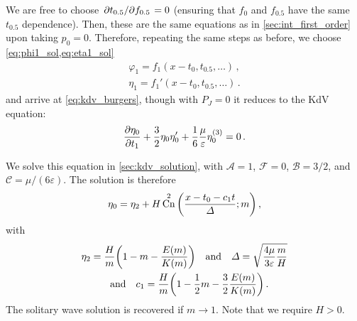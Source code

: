 \documentclass{jfm}
\DeclareMathOperator{\cn}{Cn}
\renewcommand*{\epsilon}{\varepsilon}
\begin{document}
We are free to choose $\pdv*{t_{0.5}}{f_{0.5}} = 0$ (ensuring that $f_0$
and $f_{0.5}$ have the same $t_{0.5}$ dependence).
Then, these are the same equations as in \cref{sec:int_first_order} upon
taking $p_0=0$.
Therefore, repeating the same steps as before, we choose
\cref{eq:phi1_sol,eq:eta1_sol}
\begin{align}
  \varphi_1 = f_1(x-t_0,t_{0.5},\ldots) \,, \\
  \eta_1 = f_1'(x-t_0,t_{0.5},\ldots) \,.
\end{align}
and arrive at \cref{eq:kdv_burgers}, though with $P_J =0$ it reduces to
the KdV equation:
\begin{equation}
  \pdv{\eta_0}{t_1} + \frac{3}{2} \eta_0 \eta_0' + \frac{1}{6}
    \frac{\mu}{\epsilon} \eta_0^{(3)} = 0 \,.
\end{equation}

We solve this equation in \cref{sec:kdv_solution}, with $\mathcal{A} =
1$, $\mathcal{F} = 0$, $\mathcal{B} = 3/2$, and $\mathcal{C} = \mu/(6
\epsilon)$.
The solution is therefore
\begin{equation}
  \eta_0 = \eta_2 + H \cn^2\pqty{\frac{x-t_0-c_1 t}{\Delta}; m} \,,
\end{equation}
with
\begin{gather}
  \eta_2 = \frac{H}{m} \pqty{1 - m - \frac{E(m)}{K(m)}}
  \qq{and}
  \Delta = \sqrt{\frac{4 \mu}{3 \epsilon} \frac{m}{H}}
  \\
  \qq{and}
  c_1 = \frac{H}{m} \pqty{1 - \frac{1}{2} m - \frac{3}{2}
    \frac{E(m)}{K(m)}} \,.
\end{gather}
The solitary wave solution is recovered if $m \to 1$.
Note that we require $H > 0$.
\end{document}
